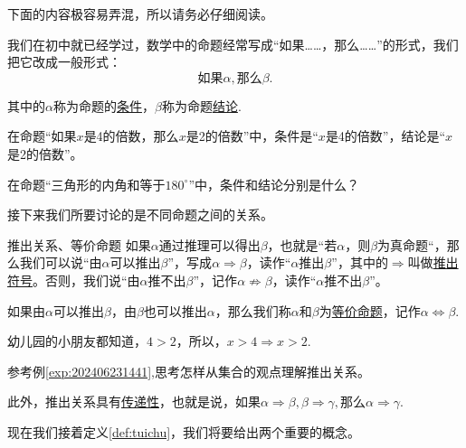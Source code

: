 \documentclass[lang=cn,math=cm,chinesefont=nofont,11pt,scheme=chinese,twocol]{elegantbook}
\begin{document}
\begin{remark}
  下面的内容极容易弄混，所以请务必仔细阅读。
\end{remark}

我们在初中就已经学过，数学中的命题经常写成“如果……，那么……”的形式，我们把它改成一般形式：
$$\text{如果}\alpha ,\text{那么}\beta.$$

其中的$\alpha$称为命题的\underline{条件}，$\beta$称为命题\underline{结论}.

\begin{example}
  在命题“如果$x$是4的倍数，那么$x$是2的倍数”中，条件是“$x$是4的倍数”，结论是“$x$是2的倍数”。
\end{example}

\begin{exercise}
  在命题“三角形的内角和等于$180^{\circ}$”中，条件和结论分别是什么？
\end{exercise}

\hspace*{\fill}

接下来我们所要讨论的是不同命题之间的关系。

\begin{definition}{推出关系、等价命题}\label{def:tuichu}
  如果$\alpha$通过推理可以得出$\beta$，也就是“若$\alpha$，则$\beta$为真命题“，那么我们可以说“由$\alpha$可以推出$\beta$”，写成$\alpha\Rightarrow\beta$，读作“$\alpha$推出$\beta$”，其中的$\Rightarrow$叫做\underline{推出符号}。否则，我们说“由$\alpha$推不出$\beta$”，记作$\alpha\nRightarrow\beta$，读作“$\alpha$推不出$\beta$”。

  如果由$\alpha$可以推出$\beta$，由$\beta$也可以推出$\alpha$，那么我们称$\alpha$和$\beta$为\underline{等价命题}，记作$\alpha\Leftrightarrow\beta$.
\end{definition}

\begin{example}\label{exp:202406231441}
  幼儿园的小朋友都知道，$4>2$，所以，$x>4\Rightarrow x>2$.
\end{example}

\begin{problem}\label{202406262000}
  参考例\ref{exp:202406231441},思考怎样从集合的观点理解推出关系。
\end{problem}

此外，推出关系具有\underline{传递性}，也就是说，如果$\alpha\Rightarrow\beta,\beta\Rightarrow\gamma,$那么$\alpha\Rightarrow\gamma$.

\hspace*{\fill}

现在我们接着定义\ref{def:tuichu}，我们将要给出两个重要的概念。
\end{document}
